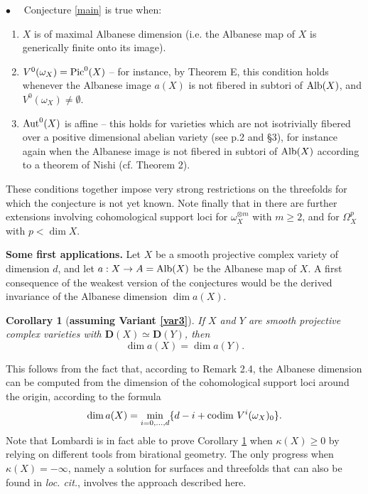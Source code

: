 \documentclass{amsart}
\theoremstyle{plain}
\newtheorem{corollary}[theorem]{Corollary}
\theoremstyle{definition}
\numberwithin{equation}{section}
\begin{document}
\noindent
$\bullet$~\,\,~Conjecture \ref{main} is true when:
\begin{enumerate}
\item $X$ is of maximal Albanese dimension (i.e. the Albanese map of $X$ is generically finite onto its image).
\item $V^0 (\omega_X) = {\rm Pic}^0 (X)$ -- for instance, by \cite{PP} Theorem E, this condition holds whenever 
the Albanese image $a(X)$ is not fibered in subtori of ${\rm Alb}(X)$, and $V^0 (\omega_X) \neq \emptyset$. 
\item ${\rm Aut}^0 (X)$ is affine --  this holds for 
varieties which are not isotrivially fibered over a positive dimensional abelian variety (see \cite{brion} p.2 and \S3), for instance again when the Albanese image is not fibered in subtori of ${\rm Alb}(X)$ according to a theorem of Nishi (cf. \cite{matsumura} Theorem 2).
\end{enumerate}

These conditions together impose very strong restrictions on the threefolds for which the conjecture is 
not yet known.
Note finally that in \cite{lombardi} there are further extensions involving cohomological support loci for $\omega_X^{\otimes m}$ with 
$m \ge 2$, and for $\Omega_X^p$ with $p < \dim X$.

\noindent
{\bf Some first applications.}
Let $X$ be a smooth projective complex variety of dimension $d$, and let $a: X \rightarrow A = {\rm Alb}(X)$ 
be the Albanese map of $X$.  
A first consequence of the weakest version of the conjectures would be the derived invariance of the Albanese 
dimension $\dim a(X)$.

\begin{corollary}[\textbf{assuming Variant \ref{var3}}]\label{albanese_dimension}
If $X$ and $Y$ are smooth projective complex varieties with ${\mathbf{D}}(X) \simeq {\mathbf{D}}(Y)$, then
$$\dim a(X) = \dim a(Y).$$
\end{corollary}

This follows from the fact that, according to \cite{LP} Remark 2.4,  the Albanese dimension can be computed from the dimension 
of the cohomological support loci around the origin, according to the formula
$$\dim a(X) = \underset{i = 0, \ldots, d}{{\rm min}} \{ d - i + {\rm codim}~V^i (\omega_X)_0 \}.$$
Note that Lombardi \cite{lombardi} is in fact able to prove Corollary \ref{albanese_dimension} 
when $\kappa(X) \ge 0$ by relying on different tools from birational geometry.
The only progress when $\kappa(X) = -\infty$, namely a solution for surfaces and threefolds 
that can  also be found in \emph{loc. cit.}, involves the approach described here. 
\end{document}
